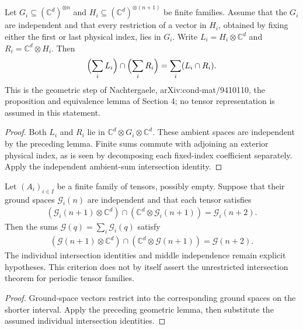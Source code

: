 \begin{lemma}
    \label{thm:joint_restriction_intersection_middle_independence}
    \leanok
    Let $G_i\subseteq(\mathbb C^d)^{\otimes n}$ and
    $H_i\subseteq(\mathbb C^d)^{\otimes(n+1)}$ be finite families.
    Assume that the $G_i$ are independent and that every restriction of a
    vector in $H_i$, obtained by fixing either the first or last physical
    index, lies in $G_i$. Write
    $L_i=H_i\otimes\mathbb C^d$ and $R_i=\mathbb C^d\otimes H_i$.
    Then
    \begin{align}
        \Bigl(\sum_iL_i\Bigr)\cap\Bigl(\sum_iR_i\Bigr)
        =\sum_i(L_i\cap R_i).
    \end{align}
    This is the geometric step of Nachtergaele,
    arXiv:cond-mat/9410110, the proposition and equivalence lemma of Section 4; no tensor representation
    is assumed in this statement.
\end{lemma}
\begin{proof}\leanok
    Both $L_i$ and $R_i$ lie in
    $\mathbb C^d\otimes G_i\otimes\mathbb C^d$.
    These ambient spaces are independent by the preceding lemma.
    Finite sums commute with adjoining an exterior physical index, as is
    seen by decomposing each fixed-index coefficient separately.
    Apply the independent ambient-sum intersection identity.
\end{proof}

\begin{lemma}
    \label{thm:joint_ground_space_intersection_middle_independence}
    \leanok
    Let $(A_i)_{i\in I}$ be a finite family of tensors, possibly empty.
    Suppose that their ground spaces $\mathcal G_i(n)$ are independent
    and that each tensor satisfies
    \begin{align}
        (\mathcal G_i(n+1)\otimes\mathbb C^d)
        \cap(\mathbb C^d\otimes\mathcal G_i(n+1))
        =\mathcal G_i(n+2).
    \end{align}
    Then the sums $\mathcal G(q)=\sum_i\mathcal G_i(q)$ satisfy
    \begin{align}
        (\mathcal G(n+1)\otimes\mathbb C^d)
        \cap(\mathbb C^d\otimes\mathcal G(n+1))
        =\mathcal G(n+2).
    \end{align}
    The individual intersection identities and middle independence remain
    explicit hypotheses. This criterion does not by itself assert the
    unrestricted intersection theorem for periodic tensor families.
\end{lemma}
\begin{proof}\leanok
    Ground-space vectors restrict into the corresponding ground spaces
    on the shorter interval. Apply the preceding geometric lemma, then
    substitute the assumed individual intersection identities.
\end{proof}

